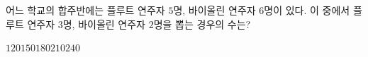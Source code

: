 \hspace*{2mm}\begin{minipage}[t]{\dimexpr\linewidth-2mm\relax}\vspace{0pt}
어느 학교의 합주반에는 플루트 연주자 $5$명, 바이올린 연주자 $6$명이 있다. 이 중에서 플루트 연주자 $3$명, 바이올린 연주자 $2$명을 뽑는 경우의 수는?
\begin{choices32}{$120$}{$150$}{$180$}{$210$}{$240$}\end{choices32}\end{minipage}

